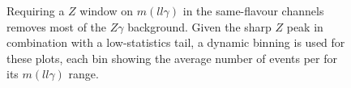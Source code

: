     \begin{figure}
      \centering
      \caption{Requiring a $Z$ window on $m(ll\gamma)$ in the same-flavour channels removes most of the $Z\gamma$ background. Given the sharp $Z$ peak in combination with a low-statistics tail, a dynamic binning
      is used for these plots, each bin showing the average number of events per \GeV for its $m(ll\gamma)$ range.}
      \label{fig:llg}
    \end{figure}

